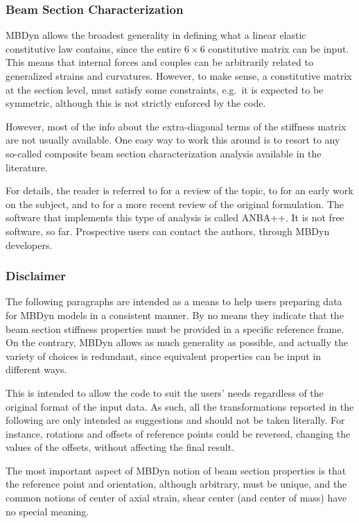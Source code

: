 \subsubsection{Beam Section Characterization}
MBDyn allows the broadest generality in defining what a linear elastic 
constitutive law contains, since the entire $6\times{6}$ constitutive
matrix can be input.
This means that internal forces and couples can be arbitrarily related
to generalized strains and curvatures.
However, to make sense, a constitutive matrix at the section level,
must satisfy some constraints, e.g.\ it is expected to be symmetric, 
although this is not strictly enforced by the code.

However, most of the info about the extra-diagonal terms 
of the stiffness matrix are not usually available.
One easy way to work this around is to resort to any so-called
composite beam section characterization analysis available 
in the literature.

For details, the reader is referred to \cite{HODGES-REVIEW90} 
for a review of the topic, to \cite{ANBA-GIAVOTTO-83}
for an early work on the subject, and to \cite{MASARATI-2001}
for a more recent review of the original formulation.
The software that implements this type of analysis is called ANBA++.
It is not free software, so far.
Prospective users can contact the authors, through MBDyn developers.


\subsubsection{Disclaimer}
The following paragraphs are intended as a means to help users
preparing data for MBDyn models in a consistent manner.
By no means they indicate that the beam section stiffness properties
must be provided in a specific reference frame.
On the contrary, MBDyn allows as much generality as possible,
and actually the variety of choices is redundant, since equivalent
properties can be input in different ways.

This is intended to allow the code to suit the users' needs
regardless of the original format of the input data.
As such, all the transformations reported in the following 
are only intended as suggestions and should not be taken literally.
For instance, rotations and offsets of reference points
could be reversed, changing the values of the offsets, without
affecting the final result.

The most important aspect of MBDyn notion of beam section properties
is that the reference point and orientation, although arbitrary,
must be unique, and the common notions of center of axial strain,
shear center (and center of mass) have no special meaning.



